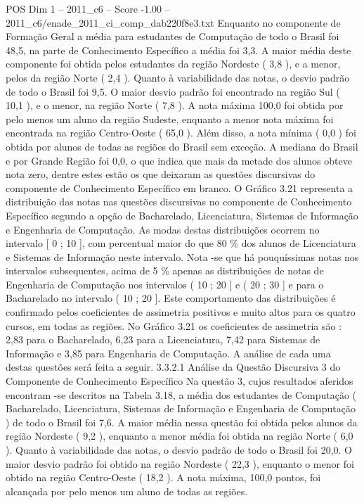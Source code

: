 \begin{textsample}{POS Dim 1 – 2011\_c6 – Score -1.00 – 2011\_c6/enade\_2011\_ci\_comp\_dab220f8e3.txt}
Enquanto no componente de Formação Geral a média para estudantes de Computação de todo o Brasil foi 48,5, na parte de Conhecimento Específico a média foi 3,3.
A maior média deste componente foi obtida pelos estudantes da região Nordeste ( 3,8 ), e a menor, pelos da região Norte ( 2,4 ).
Quanto à variabilidade das notas, o desvio padrão de todo o Brasil foi 9,5.
O maior desvio padrão foi encontrado na região Sul ( 10,1 ), e o menor, na região Norte ( 7,8 ).
A nota máxima 100,0 foi obtida por pelo menos um aluno da região Sudeste, enquanto a menor nota máxima foi encontrada na região Centro-Oeste ( 65,0 ).
Além disso, a nota mínima ( 0,0 ) foi obtida por alunos de todas as regiões do Brasil sem exceção.
A mediana do Brasil e por Grande Região foi 0,0, o que indica que mais da metade dos alunos obteve nota zero, dentre estes estão os que deixaram as questões discursivas do componente de Conhecimento Específico em branco.
O Gráfico 3.21 representa a distribuição das notas nas questões discursivas no componente de Conhecimento Específico segundo a opção de Bacharelado, Licenciatura, Sistemas de Informação e Engenharia de Computação.
As modas destas distribuições ocorrem no intervalo [ 0 ; 10 ], com percentual maior do que 80 \% dos alunos de Licenciatura e Sistemas de Informação neste intervalo.
Nota -se que há pouquíssimas notas nos intervalos subsequentes, acima de 5 \% apenas as distribuições de notas de Engenharia de Computação nos intervalos ( 10 ; 20 ] e ( 20 ; 30 ] e para o Bacharelado no intervalo ( 10 ; 20 ].
Este comportamento das distribuições é confirmado pelos coeficientes de assimetria positivos e muito altos para os quatro cursos, em todas as regiões.
No Gráfico 3.21 os coeficientes de assimetria são : 2,83 para o Bacharelado, 6,23 para a Licenciatura, 7,42 para Sistemas de Informação e 3,85 para Engenharia de Computação.
A análise de cada uma destas questões será feita a seguir. 3.3.2.1 Análise da Questão Discursiva 3 do Componente de Conhecimento Específico Na questão 3, cujos resultados aferidos encontram -se descritos na Tabela 3.18, a média dos estudantes de Computação ( Bacharelado, Licenciatura, Sistemas de Informação e Engenharia de Computação ) de todo o Brasil foi 7,6.
A maior média nessa questão foi obtida pelos alunos da região Nordeste ( 9,2 ), enquanto a menor média foi obtida na região Norte ( 6,0 ).
Quanto à variabilidade das notas, o desvio padrão de todo o Brasil foi 20,0.
O maior desvio padrão foi obtido na região Nordeste ( 22,3 ), enquanto o menor foi obtido na região Centro-Oeste ( 18,2 ).
A nota máxima, 100,0 pontos, foi alcançada por pelo menos um aluno de todas as regiões.

\end{textsample}
